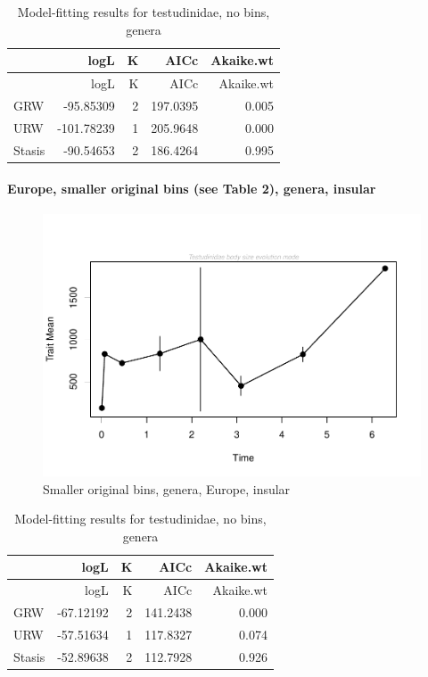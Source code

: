 \documentclass[]{article}
\let\oldparagraph\paragraph
\renewcommand{\paragraph}[1]{\oldparagraph{#1}\mbox{}}
\begin{document}
\begin{longtable}[]{@{}lrrrr@{}}
\caption{Model-fitting results for testudinidae, no bins,
genera}\tabularnewline
\toprule
& logL & K & AICc & Akaike.wt\tabularnewline
\midrule
\endfirsthead
\toprule
& logL & K & AICc & Akaike.wt\tabularnewline
\midrule
\endhead
GRW & -95.85309 & 2 & 197.0395 & 0.005\tabularnewline
URW & -101.78239 & 1 & 205.9648 & 0.000\tabularnewline
Stasis & -90.54653 & 2 & 186.4264 & 0.995\tabularnewline
\bottomrule
\end{longtable}

\newpage

\paragraph{Europe, smaller original bins (see Table 2), genera,
insular}\label{europe-smaller-original-bins-see-table-2-genera-insular}

\begin{figure}[htbp]
\centering
\includegraphics{MA_JJ_files/figure-latex/paleoTS with different time bins, no bins, genera, Europe, insular-1.pdf}
\caption{Smaller original bins, genera, Europe, insular}
\end{figure}

\begin{longtable}[]{@{}lrrrr@{}}
\caption{Model-fitting results for testudinidae, no bins,
genera}\tabularnewline
\toprule
& logL & K & AICc & Akaike.wt\tabularnewline
\midrule
\endfirsthead
\toprule
& logL & K & AICc & Akaike.wt\tabularnewline
\midrule
\endhead
GRW & -67.12192 & 2 & 141.2438 & 0.000\tabularnewline
URW & -57.51634 & 1 & 117.8327 & 0.074\tabularnewline
Stasis & -52.89638 & 2 & 112.7928 & 0.926\tabularnewline
\bottomrule
\end{longtable}
\end{document}
